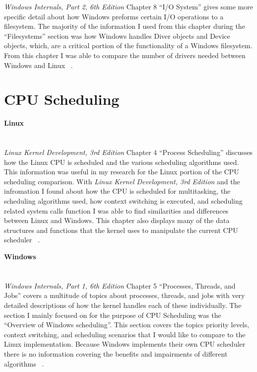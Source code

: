 \documentclass[letterpaper,10pt,notitlepage,fleqn]{article}
\begin{document}
\textit{Windows Internals, Part 2, 6th Edition} Chapter 8 ``I/O System'' gives some 
more specific detail  about how Windows preforms certain I/O operations to a 
filesystem. The majority of the information I used from this chapter during the 
``Filesystems'' section was how Windows handles Diver objects and Device objects, which, 
are a critical portion of the functionality of a Windows filesystem. From this chapter
I was able to compare the number of drivers needed between Windows and Linux 
~\cite{WI26}.



\section{CPU Scheduling}

\textbf{Linux} \\ \\ \\
\textit{Linux Kernel Development, 3rd Edition} Chapter 4 ``Process Scheduling'' 
discusses how the Linux CPU is scheduled and the various scheduling algorithms used.  
This information was useful in my research for the Linux portion of the CPU scheduling 
comparison. With \textit{Linux Kernel Development, 3rd Edition} and the infromation I found
about how the CPU is 
scheduled for multitasking, the scheduling algorithms used, how context switching is executed, and scheduling  
related system calls function I was able to find similarities and differences between Linux and Windows. This chapter also displays many of the data structures and 
functions that the kernel uses to manipulate the current CPU scheduler ~\cite{LKD3}. 

\textbf{Windows} \\ \\ \\
\textit{Windows Internals, Part 1, 6th Edition} Chapter 5 ``Processes, Threads, and Jobs'' 
covers a multitude of topics about processes, threads, and jobs with very detailed 
descriptions of how the kernel handles each of these individually. The section I 
mainly focused on for the purpose of CPU Scheduling was the ``Overview of Windows 
scheduling''. This section covers the topics priority levels, context switching, 
and scheduling scenarios that I would like to compare to the Linux implementation. 
Because Windows implements their own CPU scheduler there is no information covering 
the benefits and impairments of different algorithms ~\cite{WI16}. 
\\


{}

\end{document}
